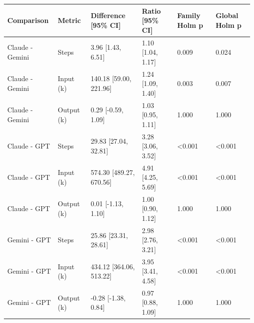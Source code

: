 \begin{tabular}{llllll}
\hline
Comparison & Metric & Difference [95\% CI] & Ratio [95\% CI] & Family Holm p & Global Holm p \\
\hline
Claude - Gemini & Steps & 3.96 [1.43, 6.51] & 1.10 [1.04, 1.17] & 0.009 & 0.024 \\
Claude - Gemini & Input (k) & 140.18 [59.00, 221.96] & 1.24 [1.09, 1.40] & 0.003 & 0.007 \\
Claude - Gemini & Output (k) & 0.29 [-0.59, 1.09] & 1.03 [0.95, 1.11] & 1.000 & 1.000 \\
Claude - GPT & Steps & 29.83 [27.04, 32.81] & 3.28 [3.06, 3.52] & \textless{}0.001 & \textless{}0.001 \\
Claude - GPT & Input (k) & 574.30 [489.27, 670.56] & 4.91 [4.25, 5.69] & \textless{}0.001 & \textless{}0.001 \\
Claude - GPT & Output (k) & 0.01 [-1.13, 1.10] & 1.00 [0.90, 1.12] & 1.000 & 1.000 \\
Gemini - GPT & Steps & 25.86 [23.31, 28.61] & 2.98 [2.76, 3.21] & \textless{}0.001 & \textless{}0.001 \\
Gemini - GPT & Input (k) & 434.12 [364.06, 513.22] & 3.95 [3.41, 4.58] & \textless{}0.001 & \textless{}0.001 \\
Gemini - GPT & Output (k) & -0.28 [-1.38, 0.84] & 0.97 [0.88, 1.09] & 1.000 & 1.000 \\
\hline
\end{tabular}
